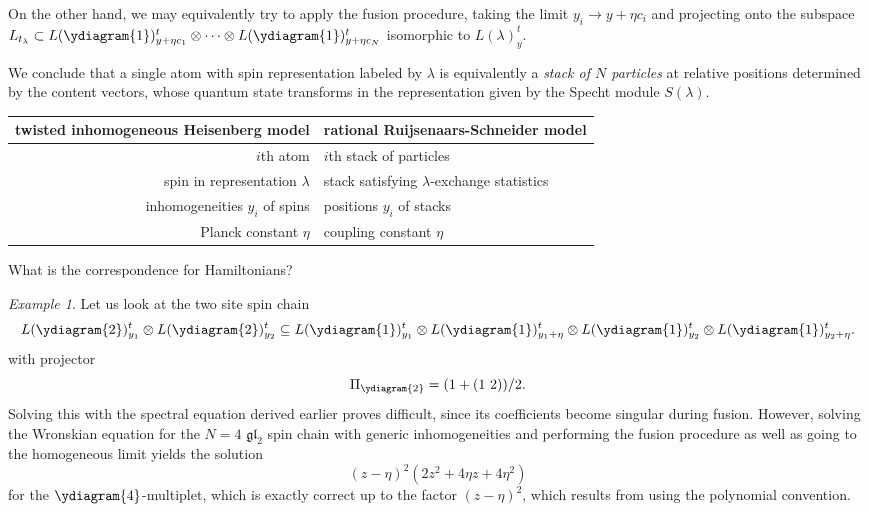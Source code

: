 \documentclass[11pt]{report}
\theoremstyle{definition}
\theoremstyle{remark}
\theoremstyle{remark}
\newtheorem*{example}{Example}
\begin{document}
On the other hand, we may equivalently try to apply the fusion procedure, taking the limit $y_i \to y + \eta c_i$ and projecting onto the subspace $L_{t_\lambda} \subset L(\ydiagram{1})_{y+\eta c_1}^t \otimes \cdots \otimes L(\ydiagram{1})_{y+\eta c_N}^t$ isomorphic to $L(\lambda)_y^t$.

We conclude that a single atom with spin representation labeled by $\lambda$ is equivalently a \emph{stack of $N$ particles} at relative positions determined by the content vectors, whose quantum state transforms in the representation given by the Specht module $S(\lambda)$.

\begin{center}
\begin{tabular}{|r||l|}
\hline
twisted inhomogeneous Heisenberg model & rational Ruijsenaars-Schneider model \\
\hline
$i$th atom & $i$th stack of particles \\
spin in representation $\lambda$ & stack satisfying $\lambda$-exchange statistics \\
inhomogeneities $y_i$ of spins & positions $y_i$ of stacks \\
Planck constant $\eta$ & coupling constant $\eta$ \\
\hline
\end{tabular}
\end{center}

What is the correspondence for Hamiltonians?

\begin{example}
Let us look at the two site spin chain
\begin{equation*}
L(\ydiagram{2})_{y_1}^t \otimes L(\ydiagram{2})_{y_2}^t \subseteq L(\ydiagram{1})_{y_1}^t \otimes L(\ydiagram{1})_{y_1+\eta}^t \otimes L(\ydiagram{1})_{y_2}^t \otimes L(\ydiagram{1})_{y_2+\eta}^t.
\end{equation*}
with projector
\begin{equation*}
\Pi_{\ydiagram{2}} = (1 + (1 \ 2))/2.
\end{equation*}
Solving this with the spectral equation derived earlier proves difficult, since its coefficients become singular during fusion. However, solving the Wronskian equation \cite{book:arutyunov:betheAnsatz} for the $N=4$ $\mathfrak{gl}_2$ spin chain with generic inhomogeneities and performing the fusion procedure as well as going to the homogeneous limit yields the solution
\begin{equation*}
(z-\eta)^2 (2 z^2 + 4 \eta z + 4 \eta^2)
\end{equation*}
for the $\ydiagram{4}$-multiplet, which is exactly correct up to the factor $(z-\eta)^2$, which results from using the polynomial convention.
\end{example}
\end{document}
